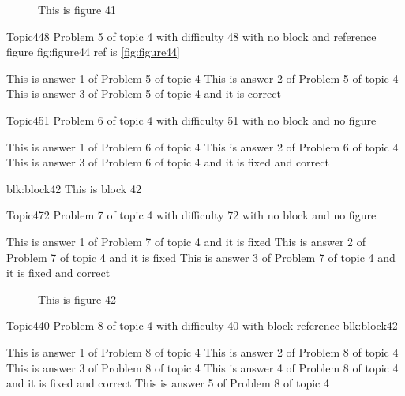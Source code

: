 \documentclass[master]{exam}
\begin{document}
\begin{figure}
	\begin{center}
		This is figure 41 
		\label{fig:figure41}
	\end{center}
\end{figure}

\begin{problem}{Topic4}{48}
	Problem 5 of topic 4 with difficulty 48 with no block and reference figure fig:figure44 ref is \ref{fig:figure44}
	\begin{answers}
		\answer This is answer 1 of Problem 5 of topic 4 
		\answer This is answer 2 of Problem 5 of topic 4 
		\answer[correct] This is answer 3 of Problem 5 of topic 4 and it is correct
	\end{answers}
\end{problem}

\begin{problem}{Topic4}{51}
	Problem 6 of topic 4 with difficulty 51 with no block and no figure
	\begin{answers}
		\answer This is answer 1 of Problem 6 of topic 4 
		\answer This is answer 2 of Problem 6 of topic 4 
		 This is answer 3 of Problem 6 of topic 4 and it is fixed and correct
	\end{answers}
\end{problem}



\begin{block}{blk:block42}
This is block 42
\end{block}


\begin{problem}{Topic4}{72}
	Problem 7 of topic 4 with difficulty 72 with no block and no figure
	\begin{answers}
		\answer[fixed] This is answer 1 of Problem 7 of topic 4 and it is fixed
		\answer[fixed] This is answer 2 of Problem 7 of topic 4 and it is fixed
		 This is answer 3 of Problem 7 of topic 4 and it is fixed and correct
	\end{answers}
\end{problem}



\begin{figure}
	\begin{center}
		This is figure 42 
		\label{fig:figure42}
	\end{center}
\end{figure}

\begin{problem}[requires=blk:block42]{Topic4}{40}
	Problem 8 of topic 4 with difficulty 40 with block reference blk:block42
	\begin{answers}
		\answer This is answer 1 of Problem 8 of topic 4 
		\answer This is answer 2 of Problem 8 of topic 4 
		\answer This is answer 3 of Problem 8 of topic 4 
		 This is answer 4 of Problem 8 of topic 4 and it is fixed and correct
		\answer This is answer 5 of Problem 8 of topic 4 
	\end{answers}
\end{problem}
\end{document}
